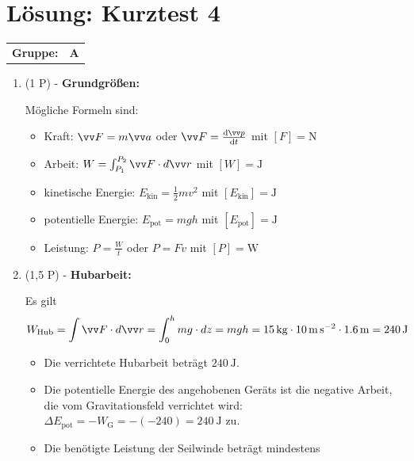 \documentclass[11pt, a4paper]{article}
\begin{document}
\section*{\LARGE Lösung: Kurztest 4}
\noindent
\begin{tabular}{ll}
    \textbf{Gruppe: } & \LARGE\textbf{A}  \\[0.3cm]
\end{tabular}

\begin{enumerate}[label=\textbf{\arabic*.},itemsep=0.50cm]

    \item (1 P) - \textbf{Grundgrößen:}
    \begin{solutionbox}
        Mögliche Formeln sind:
        \begin{itemize}[itemsep=0pt, topsep=2pt]
            \item Kraft: $\ivec{F} = m \ivec{a}$ oder $\ivec{F} = \frac{\dd \ivec{p}}{\dd t}$ mit $[F] = \si{\newton}$
            \item Arbeit: $W = \int_{P_1}^{P_2} \ivec{F} \cdot d\ivec{r}$ mit $[W] = \si{\joule}$
            \item kinetische Energie: $E_{\text{kin}} = \frac{1}{2}mv^2$ mit $[E_{\text{kin}}] = \si{\joule}$
            \item potentielle Energie: $E_{\text{pot}} = mgh$ mit $[E_{\text{pot}}] = \si{\joule}$
            \item Leistung: $P = \frac{W}{t}$ oder $P = Fv$ mit $[P] = \si{\watt}$
        \end{itemize}
    \end{solutionbox}
    \vspace{1cm}
    \item (1,5 P) - \textbf{Hubarbeit:}
    \begin{solutionbox}
        Es gilt
        \[
        W_{\text{Hub}} = \int \ivec{F} \cdot d\ivec{r} = \int_{0}^{h} mg \cdot dz = mgh = \SI{15}{\kilogram} \cdot \SI{10}{\meter\per\second\squared} \cdot \SI{1.6}{\meter} = \SI{240}{\joule}
        \]
        \begin{itemize}[itemsep=0pt, topsep=2pt]
            \item Die verrichtete Hubarbeit beträgt $\SI{240}{\joule}$.
            \item Die potentielle Energie des angehobenen Geräts ist die negative Arbeit, die vom Gravitationsfeld verrichtet wird:  $\Delta E_{\text{pot}} = -W_\text{G} = -(-240) = \SI{240}{\joule}$ zu.
            \item Die benötigte Leistung der Seilwinde beträgt mindestens

\end{itemize}
\end{solutionbox}
\end{enumerate}
\end{document}
